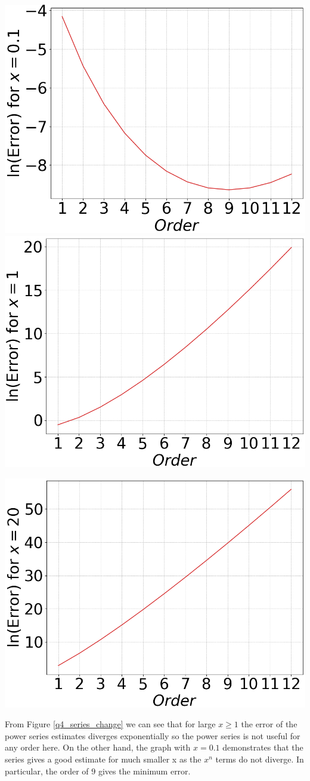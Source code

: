 \documentclass[12pt, a4paper]{article}
\begin{document}
\begin{minipage}{\textwidth}
	\centering
	\includegraphics[width=0.49\linewidth]{q4_series_x=0.1}
	\includegraphics[width=0.49\linewidth]{q4_series_x=1}

	\vspace{0.3cm}

	\includegraphics[width=0.5\linewidth]{q4_series_x=20}

	\vspace*{-0.2cm}

	\label{q4_series_change}
\end{minipage}
\vspace{0.5cm}

From Figure \ref{q4_series_change} we can see that for large $x \geq 1$ the error of the power series
estimates diverges exponentially so the power series is not useful for any order here. On the other
hand, the graph with $x = 0.1$ demonstrates that the series gives a good estimate for much smaller x
as the $x^{n}$ terms do not diverge. In particular, the order of $9$ gives the minimum error.
\end{document}
